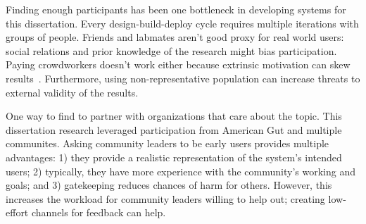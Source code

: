 

Finding enough participants has been one bottleneck in developing systems for this dissertation. Every design-build-deploy cycle requires multiple iterations with groups of people. Friends and labmates aren't good proxy for real world users: social relations and prior knowledge of the research might bias participation. Paying crowdworkers doesn't work either because extrinsic motivation can skew results~\cite{Chandler2013}. Furthermore, using non-representative population can increase threats to external validity of the results.

One way to find to partner with organizations that care about the topic. This dissertation research leveraged participation from American Gut and multiple communites. Asking community leaders to be early users provides multiple advantages: 1) they provide a realistic representation of the system's intended users; 2) typically, they have more experience with the community's working and goals; and 3) gatekeeping reduces chances of harm for others. However, this increases the workload for community leaders willing to help out; creating low-effort channels for feedback can help.

